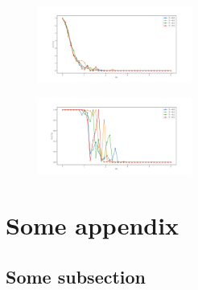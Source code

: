 \documentclass[11pt, a4paper, twocolumn]{article}
\begin{document}
\begin{figure}[H]
  \begin{center}
  \includegraphics[width=0.45\textwidth]{./media/transmission_graphene_lat_phi=0dot0Wmax=5.png}
  \caption{}
  \label{fig:transmission_graphene_lat_phi_0dot0Wmax_5.png}
  \end{center}
\end{figure}

\begin{figure}[H]
  \begin{center}
  \includegraphics[width=0.45\textwidth]{./media/transmission_graphene_lat_phi=0dot6Wmax=5.png}
  \caption{}
  \label{fig:transmission_graphene_lat_phi_0dot6Wmax_5.png}
  \end{center}
\end{figure}


\nocite{*}



\appendix
\section{Some appendix}
\subsection{Some subsection}
\end{document}
